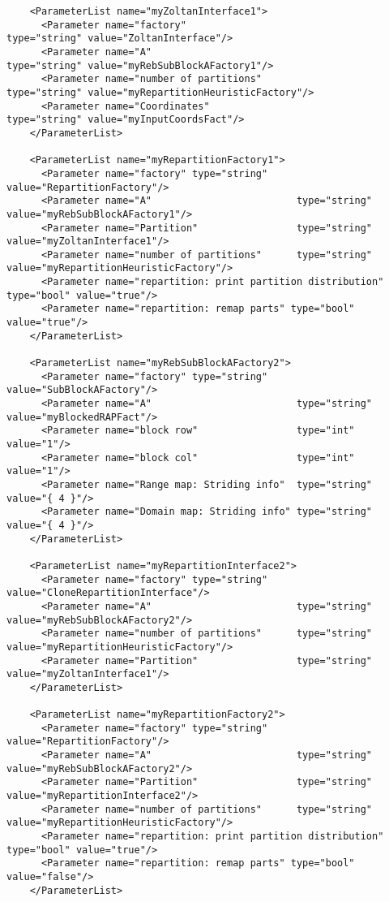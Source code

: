 \documentclass[10pt,fleqn]{book}
\begin{document}
\begin{lstlisting}
    <ParameterList name="myZoltanInterface1">
      <Parameter name="factory"                             type="string" value="ZoltanInterface"/>
      <Parameter name="A"                                   type="string" value="myRebSubBlockAFactory1"/>
      <Parameter name="number of partitions"                type="string" value="myRepartitionHeuristicFactory"/>
      <Parameter name="Coordinates"                         type="string" value="myInputCoordsFact"/>
    </ParameterList>

    <ParameterList name="myRepartitionFactory1">
      <Parameter name="factory" type="string" value="RepartitionFactory"/>
      <Parameter name="A"                         type="string"  value="myRebSubBlockAFactory1"/>
      <Parameter name="Partition"                 type="string"  value="myZoltanInterface1"/>
      <Parameter name="number of partitions"      type="string"  value="myRepartitionHeuristicFactory"/>
      <Parameter name="repartition: print partition distribution" type="bool" value="true"/>
      <Parameter name="repartition: remap parts" type="bool" value="true"/>
    </ParameterList>

    <ParameterList name="myRebSubBlockAFactory2">
      <Parameter name="factory" type="string" value="SubBlockAFactory"/>
      <Parameter name="A"                         type="string"  value="myBlockedRAPFact"/>
      <Parameter name="block row"                 type="int"     value="1"/>
      <Parameter name="block col"                 type="int"     value="1"/>
      <Parameter name="Range map: Striding info"  type="string"  value="{ 4 }"/>
      <Parameter name="Domain map: Striding info" type="string"  value="{ 4 }"/>
    </ParameterList>

    <ParameterList name="myRepartitionInterface2">
      <Parameter name="factory" type="string" value="CloneRepartitionInterface"/>
      <Parameter name="A"                         type="string"  value="myRebSubBlockAFactory2"/>
      <Parameter name="number of partitions"      type="string"  value="myRepartitionHeuristicFactory"/>
      <Parameter name="Partition"                 type="string"  value="myZoltanInterface1"/>
    </ParameterList>

    <ParameterList name="myRepartitionFactory2">
      <Parameter name="factory" type="string" value="RepartitionFactory"/>
      <Parameter name="A"                         type="string"  value="myRebSubBlockAFactory2"/>
      <Parameter name="Partition"                 type="string"  value="myRepartitionInterface2"/>
      <Parameter name="number of partitions"      type="string"  value="myRepartitionHeuristicFactory"/>
      <Parameter name="repartition: print partition distribution" type="bool" value="true"/>
      <Parameter name="repartition: remap parts" type="bool" value="false"/>
    </ParameterList>


\end{lstlisting}
\end{document}
